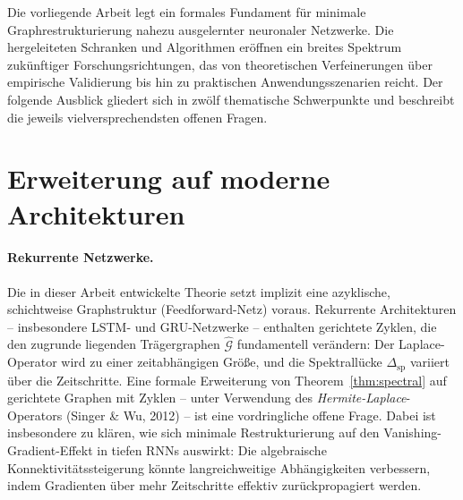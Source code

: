 \documentclass[12pt, a4paper, openany]{report}
\newcommand{\calG}{\mathcal{G}}
\begin{document}
Die vorliegende Arbeit legt ein formales Fundament für minimale
Graphrestrukturierung nahezu ausgelernter neuronaler Netzwerke.  Die
hergeleiteten Schranken und Algorithmen eröffnen ein breites Spektrum
zukünftiger Forschungsrichtungen, das von theoretischen Verfeinerungen
über empirische Validierung bis hin zu praktischen Anwendungsszenarien
reicht.  Der folgende Ausblick gliedert sich in zwölf thematische
Schwerpunkte und beschreibt die jeweils vielversprechendsten offenen
Fragen.

\section{Erweiterung auf moderne Architekturen}
\label{sec:outlook_arch}

\paragraph{Rekurrente Netzwerke.}
Die in dieser Arbeit entwickelte Theorie setzt implizit eine azyklische,
schichtweise Graphstruktur (Feedforward-Netz) voraus.  Rekurrente
Architekturen -- insbesondere LSTM- und GRU-Netzwerke -- enthalten
gerichtete Zyklen, die den zugrunde liegenden Trägergraphen $\hat{\calG}$
fundamentell verändern: Der Laplace-Operator wird zu einer zeitabhängigen
Größe, und die Spektrallücke $\Delta_{\mathrm{sp}}$ variiert über die
Zeitschritte.  Eine formale Erweiterung von Theorem~\ref{thm:spectral}
auf gerichtete Graphen mit Zyklen -- unter Verwendung des
\emph{Hermite-Laplace}-Operators (Singer \& Wu, 2012) -- ist eine
vordringliche offene Frage.  Dabei ist insbesondere zu klären, wie sich
minimale Restrukturierung auf den Vanishing-Gradient-Effekt in tiefen
RNNs auswirkt: Die algebraische Konnektivitätssteigerung könnte
langreichweitige Abhängigkeiten verbessern, indem Gradienten über mehr
Zeitschritte effektiv zurückpropagiert werden.
\end{document}
